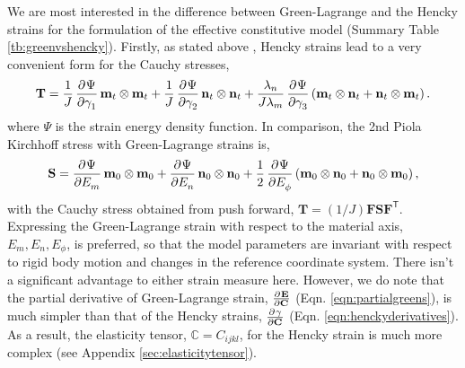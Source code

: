     

	We are most interested in the difference between Green-Lagrange and the Hencky strains for the formulation of the effective constitutive model (Summary Table \ref{tb:greenvshencky}). Firstly, as stated above , Hencky strains lead to a very convenient form for the Cauchy stresses,
\begin{equation}\label{eqn:cauchystressform}
\mathbf{T}	= \frac{1}{J} \dpd{\Psi}{\gamma_1} \mathbf{m}_t\otimes\mathbf{m}_t 
			+ \frac{1}{J} \dpd{\Psi}{\gamma_2} \mathbf{n}_t\otimes\mathbf{n}_t 
			+ \frac{\lambda_n}{J\lambda_m} \dpd{\Psi}{\gamma_3} \left(\mathbf{m}_t\otimes\mathbf{n}_t + \mathbf{n}_t\otimes\mathbf{m}_t \right).
\end{equation}
where $\Psi$ is the strain energy density function.
In comparison, the 2nd Piola Kirchhoff stress with Green-Lagrange strains is,
\begin{equation} \label{eqn:2ndpkstressform}
\mathbf{S} = \dpd{\Psi}{E_m}\mathbf{m}_0\otimes\mathbf{m}_0
+ \dpd{\Psi}{E_n}\mathbf{n}_0\otimes\mathbf{n}_0 
+ \frac{1}{2}\dpd{\Psi}{E_{\phi}}\left(\mathbf{m}_0\otimes\mathbf{n}_0 + \mathbf{n}_0\otimes\mathbf{m}_0\right),
\end{equation}
with the Cauchy stress obtained from push forward, $\mathbf{T} = (1/J) \mathbf{F}\mathbf{S}\mathbf{F}^\mathsf{T}$. Expressing the Green-Lagrange strain with respect to the material axis, ${E_m, E_n, E_\phi}$, is preferred, so that the model parameters are invariant with respect to rigid body motion and changes in the reference coordinate system. There isn't a significant advantage to either strain measure here. However, we do note that the partial derivative of Green-Lagrange strain, $\pd{\mathbf{E}}{\mathbf{C}}$ (Eqn. \ref{eqn:partialgreens}), is much simpler than that of the Hencky strains, $\pd{\gamma}{\mathbf{C}}$ (Eqn. \ref{eqn:henckyderivatives}). As a result, the elasticity tensor, $\mathbb{C} = C_{ijkl}$, for the Hencky strain is much more complex (see Appendix \ref{sec:elasticitytensor}). 

